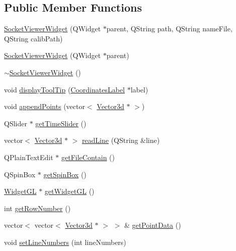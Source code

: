 \subsection*{Public Member Functions}
\begin{DoxyCompactItemize}
\item 
\mbox{\hyperlink{class_socket_viewer_widget_a6ea05cd5925269a85c333bc47cc58db9}{Socket\+Viewer\+Widget}} (Q\+Widget $\ast$parent, Q\+String path, Q\+String name\+File, Q\+String calib\+Path)
\item 
\mbox{\hyperlink{class_socket_viewer_widget_a922875865025866e34c65df9ed494295}{Socket\+Viewer\+Widget}} (Q\+Widget $\ast$parent)
\item 
\mbox{\hyperlink{class_socket_viewer_widget_a2a2c1bca1ef3d79fe1a32daa8b231ea9}{$\sim$\+Socket\+Viewer\+Widget}} ()
\item 
void \mbox{\hyperlink{class_socket_viewer_widget_a8177bb48e4f28bb3ef0ba9861502e58f}{display\+Tool\+Tip}} (\mbox{\hyperlink{class_coordinates_label}{Coordinates\+Label}} $\ast$label)
\item 
void \mbox{\hyperlink{class_socket_viewer_widget_aeb7871e57bbde86b284978e7129273dd}{append\+Points}} (vector$<$ \mbox{\hyperlink{struct_vector3d}{Vector3d}} $\ast$ $>$)
\item 
Q\+Slider $\ast$ \mbox{\hyperlink{class_socket_viewer_widget_a158278264f09fc04009af0876b7cf2aa}{get\+Time\+Slider}} ()
\item 
vector$<$ \mbox{\hyperlink{struct_vector3d}{Vector3d}} $\ast$ $>$ \mbox{\hyperlink{class_socket_viewer_widget_a5387d149cd3faff65c83efe3a1da28c4}{read\+Line}} (Q\+String \&line)
\item 
Q\+Plain\+Text\+Edit $\ast$ \mbox{\hyperlink{class_socket_viewer_widget_a24597c9eddcbdbb42a102520c79c005c}{get\+File\+Contain}} ()
\item 
Q\+Spin\+Box $\ast$ \mbox{\hyperlink{class_socket_viewer_widget_abc87688771c9c1f3d0c7dcdf593a75eb}{get\+Spin\+Box}} ()
\item 
\mbox{\hyperlink{class_widget_g_l}{Widget\+GL}} $\ast$ \mbox{\hyperlink{class_socket_viewer_widget_af3d70a0610a981a537c2e1596a685ee0}{get\+Widget\+GL}} ()
\item 
int \mbox{\hyperlink{class_socket_viewer_widget_a07e5f32f431c6113a140ea0c6c9d1aa4}{get\+Row\+Number}} ()
\item 
vector$<$ vector$<$ \mbox{\hyperlink{struct_vector3d}{Vector3d}} $\ast$ $>$ $>$ \& \mbox{\hyperlink{class_socket_viewer_widget_aa309d85a95b34b9bf8986bad5ea578f2}{get\+Point\+Data}} ()
\item 
void \mbox{\hyperlink{class_socket_viewer_widget_a2a538e85ff7a127f14dace6c5b10471d}{set\+Line\+Numbers}} (int line\+Numbers)
\end{DoxyCompactItemize}


